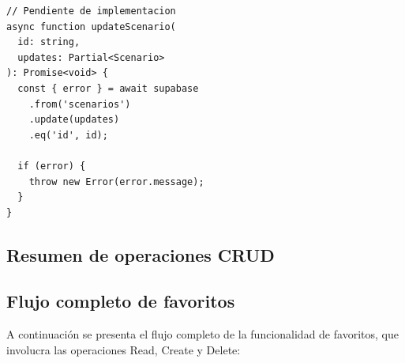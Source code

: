 \begin{lstlisting}
// Pendiente de implementacion
async function updateScenario(
  id: string,
  updates: Partial<Scenario>
): Promise<void> {
  const { error } = await supabase
    .from('scenarios')
    .update(updates)
    .eq('id', id);

  if (error) {
    throw new Error(error.message);
  }
}
\end{lstlisting}

\subsection{Resumen de operaciones CRUD}

\begin{table}[H]
  \centering
  \caption{Operaciones CRUD implementadas}
\end{table}

\subsection{Flujo completo de favoritos}

A continuaci\'on se presenta el flujo completo de la funcionalidad de
favoritos, que involucra las operaciones Read, Create y Delete:

